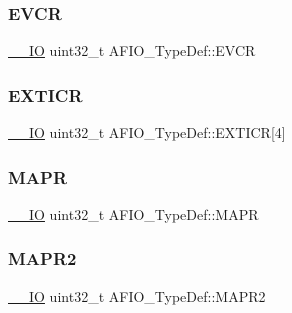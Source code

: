 \subsubsection{\texorpdfstring{EVCR}{EVCR}}
{\footnotesize\ttfamily \mbox{\hyperlink{group___c_m_s_i_s___c_m3__core__definitions_gaec43007d9998a0a0e01faede4133d6be}{\+\_\+\+\_\+\+IO}} uint32\+\_\+t A\+F\+I\+O\+\_\+\+Type\+Def\+::\+E\+V\+CR}

\mbox{\label{struct_a_f_i_o___type_def_a5f590aa12271be60c2f61b0a6d2b8772}} 
\subsubsection{\texorpdfstring{EXTICR}{EXTICR}}
{\footnotesize\ttfamily \mbox{\hyperlink{group___c_m_s_i_s___c_m3__core__definitions_gaec43007d9998a0a0e01faede4133d6be}{\+\_\+\+\_\+\+IO}} uint32\+\_\+t A\+F\+I\+O\+\_\+\+Type\+Def\+::\+E\+X\+T\+I\+CR\mbox{[}4\mbox{]}}

\mbox{\label{struct_a_f_i_o___type_def_a2b44ba1a427df7d8c0b254f869b9b463}} 
\subsubsection{\texorpdfstring{MAPR}{MAPR}}
{\footnotesize\ttfamily \mbox{\hyperlink{group___c_m_s_i_s___c_m3__core__definitions_gaec43007d9998a0a0e01faede4133d6be}{\+\_\+\+\_\+\+IO}} uint32\+\_\+t A\+F\+I\+O\+\_\+\+Type\+Def\+::\+M\+A\+PR}

\mbox{\label{struct_a_f_i_o___type_def_a4420b9fe25158ac2e5e32f6ad9d1b6ca}} 
\subsubsection{\texorpdfstring{MAPR2}{MAPR2}}
{\footnotesize\ttfamily \mbox{\hyperlink{group___c_m_s_i_s___c_m3__core__definitions_gaec43007d9998a0a0e01faede4133d6be}{\+\_\+\+\_\+\+IO}} uint32\+\_\+t A\+F\+I\+O\+\_\+\+Type\+Def\+::\+M\+A\+P\+R2}

\mbox{\label{struct_a_f_i_o___type_def_a6cf52816787797115664f0c8167a92b9}} 
